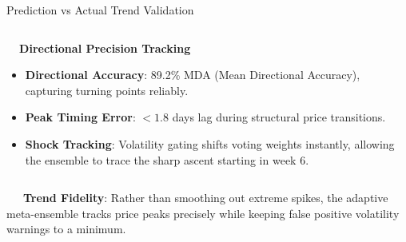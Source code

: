 \documentclass{beamer}
\begin{document}
\begin{frame}{Prediction vs Actual Trend Validation}
\begin{columns}[T]
    \begin{column}{0.48\textwidth}
        \begin{smallcard}[0.98\textwidth, top=3pt, bottom=3pt, left=4pt, right=4pt, boxsep=0.5pt]
            \centering \textbf{\textcolor{primaryDark}{\small {}~~Directional Precision Tracking}}
            \vspace{0.08cm}
            \fontsize{6.8pt}{8.2pt}\selectfont
            \begin{itemize}\setlength\itemsep{4.5pt}\setlength\parskip{0pt}
                \item \textbf{Directional Accuracy}: 89.2\% MDA (Mean Directional Accuracy), capturing turning points reliably.
                \item \textbf{Peak Timing Error}: $<1.8$ days lag during structural price transitions.
                \item \textbf{Shock Tracking}: Volatility gating shifts voting weights instantly, allowing the ensemble to trace the sharp ascent starting in week 6.
            \end{itemize}
        \end{smallcard}
    \end{column}
\end{columns}

\vspace{0.15cm}
\begin{tcolorbox}[enhanced, colback=primaryblue!4, colframe=primaryblue!30, boxrule=0.35pt,
  arc=3.5pt, width=0.98\textwidth, left=4pt, right=4pt, top=2.5pt, bottom=2.5pt, boxsep=0pt,
  halign=center, shadow={0.5pt}{-0.5pt}{0pt}{black!8}]
    \fontsize{5.5pt}{6.5pt}\selectfont
    \textcolor{primaryDark}{~~~\textbf{Trend Fidelity}: Rather than smoothing out extreme spikes, the adaptive meta-ensemble tracks price peaks precisely while keeping false positive volatility warnings to a minimum.}
\end{tcolorbox}
\end{frame}
\end{document}
